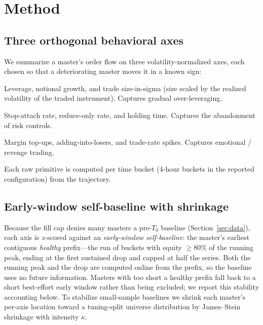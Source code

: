 \documentclass[11pt,a4paper]{article}
\newcommand{\Tnull}{T_{0}}
\begin{document}
\section{Method}
\label{sec:method}

\subsection{Three orthogonal behavioral axes}
We summarize a master's order flow on three volatility-normalized axes, each chosen
so that a deteriorating master moves it in a known sign:
\begin{description}[leftmargin=1.6em,itemsep=2pt]
  \item[Exposure ($\uparrow$ is worse).] Leverage, notional growth, and trade
        size-in-sigma (size scaled by the realized volatility of the traded
        instrument). Captures gradual over-leveraging.
  \item[Discipline ($\downarrow$ is worse).] Stop-attach rate, reduce-only rate,
        and holding time. Captures the abandonment of risk controls.
  \item[Tilt ($\uparrow$ is worse).] Margin top-ups, adding-into-losers, and
        trade-rate spikes. Captures emotional / revenge trading.
\end{description}
Each raw primitive is computed per time bucket (4-hour buckets in the reported
configuration) from the trajectory.

\subsection{Early-window self-baseline with shrinkage}
Because the fill cap denies many masters a pre-$\Tnull$ baseline
(Section~\ref{sec:data}), each axis is $z$-scored against an \emph{early-window
self-baseline}: the master's earliest contiguous \emph{healthy} prefix---the run of
buckets with equity $\geq 80\%$ of the running peak, ending at the first sustained
drop and capped at half the series. Both the running peak and the drop are computed
online from the prefix, so the baseline uses no future information. Masters with too
short a healthy prefix fall back to a short best-effort early window rather than being
excluded; we report this stability accounting below. To stabilize small-sample
baselines we shrink each master's per-axis location toward a tuning-split universe
distribution by James--Stein shrinkage \citep{james1961stein} with intensity $\kappa$.
\end{document}
